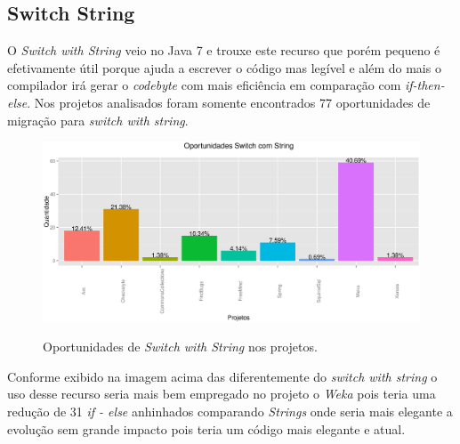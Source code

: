 \subsection{Switch String}

O \textit{Switch with String} veio no Java 7 e trouxe este recurso que porém pequeno é efetivamente útil porque ajuda a escrever o código mas legível e além do mais o compilador 
irá gerar o \textit{codebyte} com mais eficiência em comparação com \textit{if-then-else}. Nos projetos analisados foram somente encontrados 77 oportunidades de migração para \textit{switch with string}.

\begin{figure}[h]
	\center
	\includegraphics[scale=0.5]{Imagens/oportunidadesSwitchString}
	\label{fig:Switch with String}
	\caption{Oportunidades de \textit{Switch with String} nos projetos.}
\end{figure}

Conforme exibido na imagem acima das diferentemente do \textit{switch with string} o uso desse recurso seria mais bem empregado no projeto o \textit{Weka} pois teria uma redução de 31 \textit{if - else} anhinhados comparando \textit{Strings} onde seria mais elegante a evolução sem grande impacto pois teria um código mais elegante e atual.
